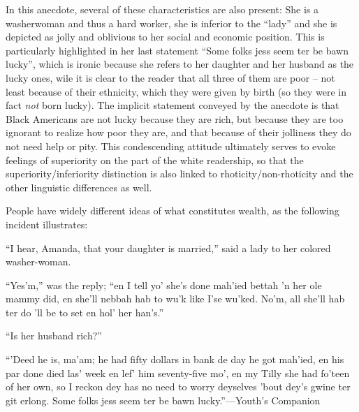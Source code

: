 In this anecdote, several of these characteristics are also present: She is a washerwoman and thus a hard worker, she is inferior to the “lady” and she is depicted as jolly and oblivious to her social and economic position. This is particularly highlighted in her last statement “Some folks jess seem ter be bawn lucky”, which is ironic because she refers to her daughter and her husband as the lucky ones, wile it is clear to the reader that all three of them are poor – not least because of their ethnicity, which they were given by birth (so they were in fact \emph{not} born lucky). The implicit statement conveyed by the anecdote is that Black Americans are not lucky because they are rich, but because they are too ignorant to realize how poor they are, and that because of their jolliness they do not need help or pity. This condescending attitude ultimately serves to evoke feelings of superiority on the part of the white readership, so that the superiority/inferiority distinction is also linked to rhoticity/non-rhoticity and the other linguistic differences as well.


\begin{ipquote}
\begin{center}
\end{center}
People have widely different ideas of what constitutes wealth, as the following incident illustrates:

“I hear, Amanda, that your daughter is married,” said a lady to her colored washer-woman.

“Yes’m,” was the reply; “en I tell yo’ she’s done mah’ied bettah ’n her ole mammy did, en she’ll nebbah hab to wu’k like I’se wu’ked. No’m, all she’ll hab ter do ’ll be to set en hol’ her han’s.”

“Is her husband rich?”

“’Deed he is, ma’am; he had fifty dollars in bank de day he got mah’ied, en his par done died las’ week en lef’ him seventy-five mo’, en my Tilly she had fo’teen of her own, so I reckon dey has no need to worry deyselves ’bout dey’s gwine ter git erlong. Some folks jess seem ter be bawn lucky.”—Youth’s Companion
\end{ipquote}

